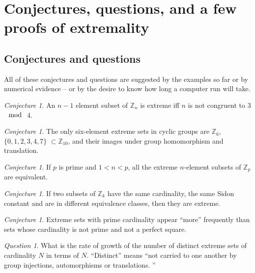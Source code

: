 \documentclass[letter,11pt]{amsart}
\numberwithin{theorem}{section}
\theoremstyle{remark}
\newtheorem{conj}[theorem]{Conjecture}
\newtheorem{ques}[theorem]{Question}
\numberwithin{equation}{section}
\newcommand\Zp[2]{\texttt{$\mathbb Z_{#1}^{\	#2}$}}
\begin{document}
\section{Conjectures, questions, and a few proofs of extremality}\label{secConjectures}

\subsection{Conjectures and questions}\label{subsecconjs}
All of these conjectures and questions are suggested by the examples so far or by
numerical evidence -- or by the desire to know how long a computer run will take.

\begin{conj}\label{conjnlessone}
An $n-1$ element subset of \Zp{n}{} is extreme iff $n$ is not congruent to 3$\mod$ 4.
\end{conj}


\begin{conj} \label{conj6elts}
The only six-element extreme sets in cyclic groups are  \Zp{6}{},  $\{0,1,2,3,4,7\}$ $\subset\Zp{10}{}$,
and their images under
group homomorphism and translation. 
\end{conj}
 
\begin{conj} \label{conjexceptionalZprime}
If $p$ is prime and $1<n<p$, all the extreme $n$-element subsets of \Zp p{} are equivalent.
\end{conj}

\begin{conj}\label{conjDiffPS}
If two subsets of \Zp{k}{} have the same cardinality, the same Sidon constant and are in different equivalence classes,
then they are extreme.
\end{conj}



\begin{conj}\label{conjprimecards}
Extreme sets with prime cardinality appear ``more'' frequently than sets whose cardinality is not prime
and not a perfect square.
\end{conj}
 
 
 \begin{ques}
 What is the rate of growth of the number of distinct extreme sets of cardinality $N$ in terms of $N$.
 ``Distinct'' means ``not carried to one another by group injections, automorphisms or translations. ''
 \end{ques}
 
\end{document}
